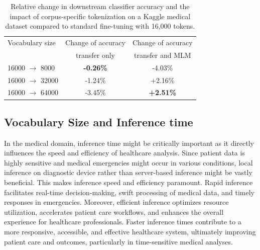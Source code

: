 \documentclass[11pt]{article}
\begin{document}

\begin{table}[t]
\centering
\begin{tabular}{l|c|c}
\hline
Vocabulary size & Change of accuracy & Change of accuracy\\
 & transfer only & transfer and MLM \\
\hline
16000 $\rightarrow$ 8000 & \textbf{-0.26\%} & -4.03\% \\
16000 $\rightarrow$ 32000 & -1.24\% & +2.16\% \\
16000 $\rightarrow$ 64000 & -3.45\% & \textbf{+2.51\%} \\
\hline
\end{tabular}

\caption{Relative change in downstream classifier accuracy and the impact of corpus-specific tokenization on a Kaggle medical dataset compared to standard fine-tuning with 16,000 tokens.}
\label{tab:classifier_accuracy}
\end{table}


\subsection{Vocabulary Size and Inference time} \label{sec:sm}

In the medical domain, inference time might be critically important as it directly influences the speed and efficiency of healthcare analysis. Since patient data is highly sensitive and medical emergencies might occur in various conditions, local inference on diagnostic device rather than server-based inference might be vastly beneficial. This makes inference speed and efficiency paramount. Rapid inference facilitates real-time decision-making, swift processing of medical data, and timely responses in emergencies. Moreover, efficient inference optimizes resource utilization, accelerates patient care workflows, and enhances the overall experience for healthcare professionals. Faster inference times contribute to a more responsive, accessible, and effective healthcare system, ultimately improving patient care and outcomes, particularly in time-sensitive medical analyses.
\end{document}
